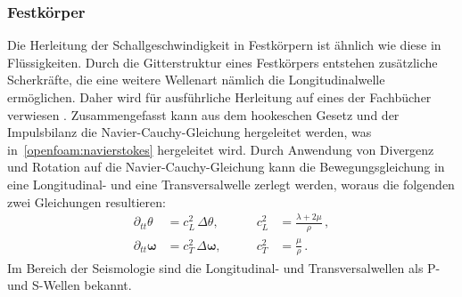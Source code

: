 \subsubsection*{Festkörper}
Die Herleitung der Schallgeschwindigkeit in Festkörpern ist ähnlich wie diese
in Flüssigkeiten. Durch die Gitterstruktur eines Festkörpers entstehen
zusätzliche Scherkräfte, die eine weitere Wellenart nämlich die
Longitudinalwelle ermöglichen. Daher wird für ausführliche Herleitung
auf eines der Fachbücher verwiesen \cite{schall:landaulifschitz,schall:gurtin}.
Zusammengefasst kann aus dem hookeschen Gesetz und der Impulsbilanz
die Navier-Cauchy-Gleichung hergeleitet werden, was in~\ref{openfoam:navierstokes}
hergeleitet wird.
Durch Anwendung von Divergenz und Rotation auf die Navier-Cauchy-Gleichung
kann die Bewegungsgleichung in eine Longitudinal- und eine Transversalwelle
zerlegt werden, woraus die folgenden zwei Gleichungen resultieren:
\[
\begin{aligned}
    \partial_{tt}\theta &= c_L^2\,\Delta\theta, & \qquad c_L^2 &= \frac{\lambda+2\mu}{\rho}\, ,\\
    \partial_{tt}\boldsymbol{\omega} &= c_T^2\,\Delta\boldsymbol{\omega}, & \qquad c_T^2 &= \frac{\mu}{\rho}\, .
\end{aligned}
\]
Im Bereich der Seismologie sind die Longitudinal- und Transversalwellen als
P- und S-Wellen bekannt.

